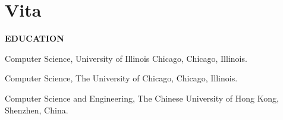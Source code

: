\chapter*{Vita}

\providecommand{\vitalabel}[1]{\textbf{#1}\hfil}

\providecommand{\vitasection}[1]{%
  \par
  \iflatexml\else\Needspace*{5\baselineskip}\fi
  \noindent\textbf{#1}\par\nobreak}

\noindent
\textbf{\theauthor}

\vspace{1em}

\vitasection{EDUCATION}
\begin{list}{}{%
  \setlength{\leftmargin}{1.6in}%
  \setlength{\labelwidth}{1.4in}%
  \setlength{\labelsep}{0.2in}%
  \setlength{\itemsep}{0.4em}%
  \setlength{\topsep}{0.5em}%
  \setlength{\parsep}{0pt}%
  \let\makelabel\vitalabel}
\item[Ph.D., 2026] Computer Science, University of Illinois Chicago, Chicago, Illinois.
\item[M.S., 2020] Computer Science, The University of Chicago, Chicago, Illinois.
\item[B.Eng., 2019] Computer Science and Engineering, The Chinese University of Hong Kong, Shenzhen, China.
\end{list}

\vspace{0.6em}


